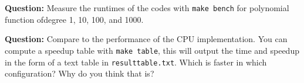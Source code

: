 \documentclass[letter]{article}
\newcommand{\question}{{\noindent \bf Question: }}
\begin{document}




\question Measure the runtimes of the codes with \texttt{make
  bench} for polynomial function ofdegree 1, 10, 100, and 1000.

\question Compare to the performance of the CPU implementation. You
can compute a speedup table with \texttt{make table}, this will output
the time and speedup in the form of a text table in \texttt{resulttable.txt}.
Which is faster in which configuration? Why do you think that is?
\end{document}
